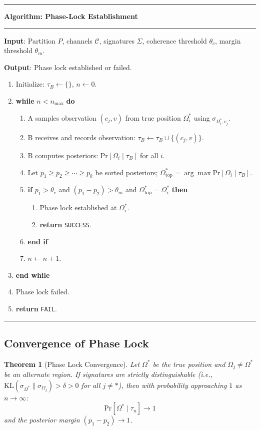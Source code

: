 \documentclass[twocolumn,10pt,a4paper]{article}
\theoremstyle{plain}
\newtheorem{theorem}{Theorem}[section]
\theoremstyle{definition}
\newcommand{\pr}[1]{\mathrm{Pr}\left[#1\right]}
\newcommand{\given}{\mid}
\newenvironment{algo}[1]
  {\par\medskip\noindent\rule{\linewidth}{0.8pt}\par\nobreak\smallskip
   \noindent\textbf{Algorithm: #1}\par\nobreak\smallskip
   \noindent\rule{\linewidth}{0.4pt}\par\nobreak\smallskip}
  {\par\smallskip\noindent\rule{\linewidth}{0.8pt}\par\medskip}
\begin{document}
\begin{algo}{Phase-Lock Establishment}
\textbf{Input}: Partition $P$, channels $\mathcal{C}$, signatures $\Sigma$, coherence threshold $\theta_c$, margin threshold $\theta_m$.

\textbf{Output}: Phase lock established or failed.

\begin{enumerate}
\item Initialize: $\tau_B \leftarrow \{\}$, $n \leftarrow 0$.
\item \textbf{while} $n < n_{\max}$ \textbf{do}
  \begin{enumerate}
  \item A samples observation $(c_j, v)$ from true position $\Omega_i^*$ using $\sigma_{\Omega_i^*, c_j}$.
  \item B receives and records observation: $\tau_B \leftarrow \tau_B \cup \{(c_j, v)\}$.
  \item B computes posteriors: $\pr{\Omega_i \given \tau_B}$ for all $i$.
  \item Let $p_1 \geq p_2 \geq \cdots \geq p_k$ be sorted posteriors; $\Omega^*_{\text{top}} = \arg\max \pr{\Omega_i \given \tau_B}$.
  \item \textbf{if} $p_1 > \theta_c$ and $(p_1 - p_2) > \theta_m$ and $\Omega^*_{\text{top}} = \Omega_i^*$ \textbf{then}
    \begin{enumerate}
    \item Phase lock established at $\Omega_i^*$.
    \item \textbf{return} \texttt{SUCCESS}.
    \end{enumerate}
  \item \textbf{end if}
  \item $n \leftarrow n + 1$.
  \end{enumerate}
\item \textbf{end while}
\item Phase lock failed.
\item \textbf{return} \texttt{FAIL}.
\end{enumerate}
\end{algo}

\subsection{Convergence of Phase Lock}

\begin{theorem}[Phase Lock Convergence]
\label{thm:convergence}
Let $\Omega^*$ be the true position and $\Omega_j \neq \Omega^*$ be an alternate region. If signatures are strictly distinguishable (i.e., $\mathrm{KL}(\sigma_{\Omega^*} \| \sigma_{\Omega_j}) > \delta > 0$ for all $j \neq *$), then with probability approaching $1$ as $n \to \infty$:
\[
\pr{\Omega^* \given \tau_n} \to 1
\]
and the posterior margin $(p_1 - p_2) \to 1$.
\end{theorem}
\end{document}
